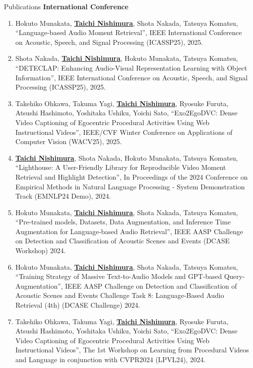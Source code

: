\begin{rSection}{Publications}
{\bf International Conference}
\vspace{-0.15cm}
\begin{enumerate}
    \item Hokuto Munakata, \underline{{\bf Taichi Nishimura}}, Shota Nakada, Tatsuya Komatsu, ``Language-based Audio Moment Retrieval'', IEEE International Conference on Acoustic, Speech, and Signal Processing (ICASSP25), 2025.
    \item Shota Nakada, \underline{{\bf Taichi Nishimura}}, Hokuto Munakata, Tatsuya Komatsu, ``DETECLAP: Enhancing Audio-Visual Representation Learning with Object Information'', IEEE International Conference on Acoustic, Speech, and Signal Processing (ICASSP25), 2025.
    \item Takehiko Ohkawa, Takuma Yagi, \underline{{\bf Taichi Nishimura}}, Ryosuke Furuta, Atsushi Hashimoto, Yoshitaka Ushiku, Yoichi Sato, ``Exo2EgoDVC: Dense Video Captioning of Egocentric Procedural Activities Using Web Instructional Videos'', IEEE/CVF Winter Conference on Applications of Computer Vision (WACV25), 2025.
    \item \underline{{\bf Taichi Nishimura}}, Shota Nakada, Hokuto Munakata, Tatsuya Komatsu, ``Lighthouse: A User-Friendly Library for Reproducible Video Moment Retrieval and Highlight Detection'', In Proceedings of the 2024 Conference on Empirical Methods in Natural Language Processing - System Demonstration Track (EMNLP24 Demo), 2024.
    \item Hokuto Munakata, \underline{{\bf Taichi Nishimura}}, Shota Nakada, Tatsuya Komatsu, ``Pre-trained models, Datasets, Data Augmentation, and Inference Time Augmentation for Language-based Audio Retrieval'', IEEE AASP Challenge on Detection and Classification of Acoustic Scenes and Events (DCASE Workshop) 2024.
    \item Hokuto Munakata, \underline{{\bf Taichi Nishimura}}, Shota Nakada, Tatsuya Komatsu, ``Training Strategy of Massive Text-to-Audio Models and GPT-based Query-Augmentation'', IEEE AASP Challenge on Detection and Classification of Acoustic Scenes and Events Challenge Task 8: Language-Based Audio Retrieval (4th) (DCASE Challenge) 2024.
    \item Takehiko Ohkawa, Takuma Yagi, \underline{{\bf Taichi Nishimura}}, Ryosuke Furuta, Atsushi Hashimoto, Yoshitaka Ushiku, Yoichi Sato, ``Exo2EgoDVC: Dense Video Captioning of Egocentric Procedural Activities Using Web Instructional Videos'', The 1st Workshop on Learning from Procedural Videos and Language in conjunction with CVPR2024 (LPVL24), 2024.

\end{enumerate}
\end{rSection}

